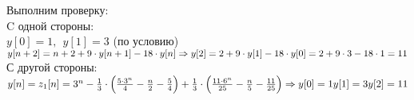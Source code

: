 Выполним проверку:\\[1mm]

C одной стороны:\\[1mm]
$y[0] = 1, \ \ y[1] = 3$ (по условию) \\[1mm]
$y[n+2] = n + 2 + 9 \cdot y[n+1] - 18 \cdot y[n] \Rightarrow \\[1mm] y[2] = 2 + 9 \cdot y[1] - 18 \cdot y[0] = 2 + 9 \cdot 3 - 18 \cdot 1 = 11$\\[1mm]

С другой стороны:\\[1mm]
$y[n] = z_1[n] = 3^n -\frac{1}{3} \cdot \Big ( \frac{5 \cdot 3^n}{4} - \frac{n}{2} - \frac{5}{4} \Big ) + \frac{1}{3} \cdot \Big ( \frac{11 \cdot 6^n}{25} - \frac{n}{5} - \frac{11}{25} \Big ) \Rightarrow \\[1mm]
y[0] = 1\\[1mm]
y[1] = 3\\[1mm]
y[2] = 11$


